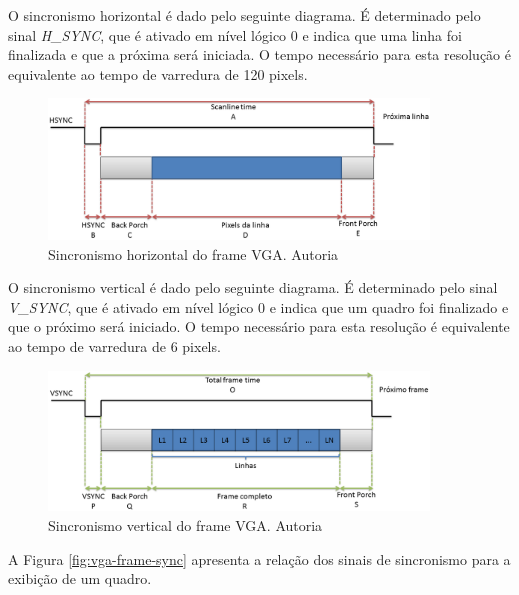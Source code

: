 \documentclass[12pt]{article}
\begin{document}
O sincronismo horizontal é dado pelo seguinte diagrama. É determinado pelo sinal \emph{H\_SYNC}, que é ativado em nível lógico 0 e indica que uma linha foi finalizada e que a próxima será iniciada. O tempo necessário para esta resolução é equivalente ao tempo de varredura de 120 pixels.

\begin{figure}[!h]
    \centering
    \includegraphics[width=0.9\textwidth]{img/controlador-vga-sincronizacao-horizontal-frame.png}
    \caption{Sincronismo horizontal do frame VGA. Autoria \cite{vga-sync}}
\end{figure}

O sincronismo vertical é dado pelo seguinte diagrama. É determinado pelo sinal \emph{V\_SYNC}, que é ativado em nível lógico 0 e indica que um quadro foi finalizado e que o próximo será iniciado. O tempo necessário para esta resolução é equivalente ao tempo de varredura de 6 pixels.

\clearpage

\begin{figure}[!h]
    \centering
    \includegraphics[width=0.9\textwidth]{img/controlador-vga-sincronizacao-vertical-frame.png}
    \caption{Sincronismo vertical do frame VGA. Autoria \cite{vga-sync}}
\end{figure}

A Figura \ref{fig:vga-frame-sync} apresenta a relação dos sinais de sincronismo para a exibição de um quadro.
\end{document}
